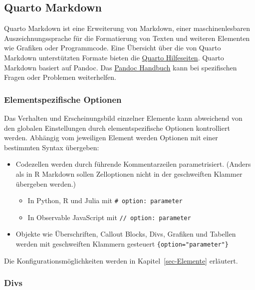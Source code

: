 \documentclass[
  letterpaper,
  DIV=11]{scrartcl}
\begin{document}
\subsection{Quarto Markdown}\label{quarto-markdown}

Quarto Markdown ist eine Erweiterung von Markdown, einer
maschinenlesbaren Auszeichnungssprache für die Formatierung von Texten
und weiteren Elementen wie Grafiken oder Programmcode. Eine Übersicht
über die von Quarto Markdown unterstützten Formate bieten die
\href{https://quarto.org/docs/guide/}{Quarto Hilfeseiten}. Quarto
Markdown basiert auf Pandoc. Das
\href{https://pandoc.org/MANUAL.html\#pandocs-markdown}{Pandoc Handbuch}
kann bei spezifischen Fragen oder Problemen weiterhelfen.

\subsubsection{Elementspezifische
Optionen}\label{elementspezifische-optionen}

Das Verhalten und Erscheinungsbild einzelner Elemente kann abweichend
von den globalen Einstellungen durch elementspezifische Optionen
kontrolliert werden. Abhängig vom jeweiligen Element werden Optionen mit
einer bestimmten Syntax übergeben:

\begin{itemize}
\item
  Codezellen werden durch führende Kommentarzeilen parametrisiert.
  (Anders als in R Markdown sollen Zelloptionen nicht in der
  geschweiften Klammer übergeben werden.)

  \begin{itemize}
  \item
    In Python, R und Julia mit \texttt{\#\textbar{}\ option:\ parameter}
  \item
    In Observable JavaScript mit
    \texttt{//\textbar{}\ option:\ parameter}
  \end{itemize}
\item
  Objekte wie Überschriften, Callout Blocks, Divs, Grafiken und Tabellen
  werden mit geschweiften Klammern gesteuert
  \texttt{\{option="parameter"\}}
\end{itemize}

Die Konfigurationsmöglichkeiten werden in Kapitel~\ref{sec-Elemente}
erläutert.

\subsubsection{Divs}\label{divs}
\end{document}
